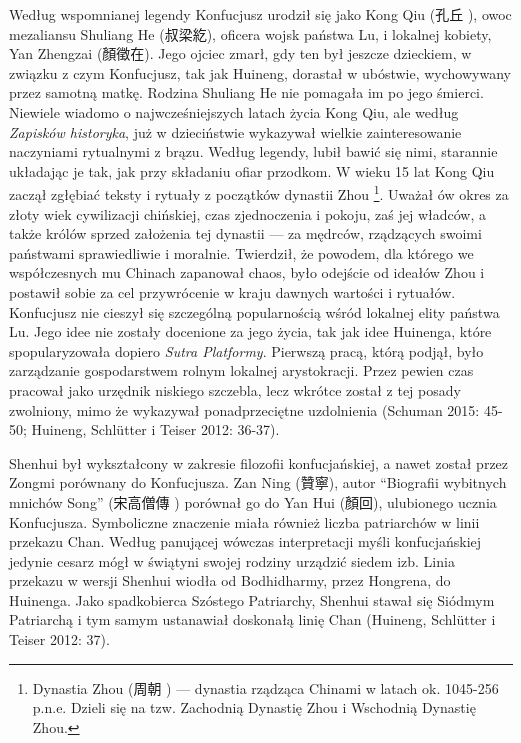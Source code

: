 Według wspomnianej legendy Konfucjusz urodził się jako Kong Qiu (孔丘 ), owoc mezaliansu Shuliang He (叔梁紇), oficera wojsk państwa Lu, i lokalnej kobiety, Yan Zhengzai (顏徵在).
Jego ojciec zmarł, gdy ten był jeszcze dzieckiem, w związku z czym Konfucjusz, tak jak Huineng, dorastał w ubóstwie, wychowywany przez samotną matkę.
Rodzina Shuliang He nie pomagała im po jego śmierci.
Niewiele wiadomo o najwcześniejszych latach życia Kong Qiu, ale według \textit{Zapisków historyka}, już w dzieciństwie wykazywał wielkie zainteresowanie naczyniami rytualnymi z brązu.
Według legendy, lubił bawić się nimi, starannie układając je tak, jak przy składaniu ofiar przodkom. W wieku 15 lat Kong Qiu zaczął zgłębiać teksty i rytuały z początków dynastii Zhou%
\footnote{Dynastia Zhou (周朝 ) --- dynastia rządząca Chinami w latach ok. 1045-256 p.n.e. Dzieli się na tzw. Zachodnią Dynastię Zhou i Wschodnią Dynastię Zhou.}.
Uważał ów okres za złoty wiek cywilizacji chińskiej, czas zjednoczenia i pokoju, zaś jej władców, a także królów sprzed założenia tej dynastii --- za mędrców, rządzących swoimi państwami sprawiedliwie i moralnie.
Twierdził, że powodem, dla którego we współczesnych mu Chinach zapanował chaos, było odejście od ideałów Zhou i postawił sobie za cel przywrócenie w kraju dawnych wartości i rytuałów.
Konfucjusz nie cieszył się szczególną popularnością wśród lokalnej elity państwa Lu.
Jego idee nie zostały docenione za jego życia, tak jak idee Huinenga, które spopularyzowała dopiero \textit{Sutra Platformy}.
Pierwszą pracą, którą podjął, było zarządzanie gospodarstwem rolnym lokalnej arystokracji.
Przez pewien czas pracował jako urzędnik niskiego szczebla, lecz wkrótce został z tej posady zwolniony, mimo że wykazywał ponadprzeciętne uzdolnienia
(Schuman 2015: 45-50; Huineng, Schlütter i Teiser 2012: 36-37).

Shenhui był wykształcony w zakresie filozofii konfucjańskiej, a nawet został przez Zongmi porównany do Konfucjusza. Zan Ning (贊寧), autor ``Biografii wybitnych mnichów Song'' (宋高僧傳 ) porównał go do Yan Hui (顏回), ulubionego ucznia Konfucjusza.
Symboliczne znaczenie miała również liczba patriarchów w linii przekazu Chan. Według panującej wówczas interpretacji myśli konfucjańskiej jedynie cesarz mógł w świątyni swojej rodziny urządzić siedem izb.
Linia przekazu w wersji Shenhui wiodła od Bodhidharmy, przez Hongrena, do Huinenga.
Jako spadkobierca Szóstego Patriarchy, Shenhui stawał się Siódmym Patriarchą i tym samym ustanawiał doskonałą linię Chan
(Huineng, Schlütter i Teiser 2012: 37).


